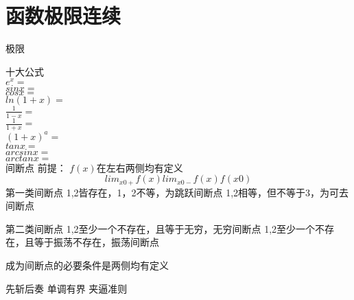 \chapter{函数极限连续}
极限

十大公式 \\
$e^x = $ \\ 
$sinx = $ \\
$cosx = $ \\ 
$ln(1+x) = $ \\
$\frac{1}{1-x} = $ \\
$\frac{1}{1+x} = $ \\
${(1+x)}^a = $ \\
$tanx = $ \\
$arcsinx = $ \\
$arctanx = $ \\

间断点
前提： $f(x)$在左右两侧均有定义
$$ lim_{x0+} f(x)  lim_{x0-}f(x) f(x0)  $$
第一类间断点 1,2皆存在，1，2不等，为跳跃间断点
1,2相等，但不等于3，为可去间断点

第二类间断点
1,2至少一个不存在，且等于无穷，无穷间断点
1,2至少一个不存在，且等于振荡不存在，振荡间断点

成为间断点的必要条件是两侧均有定义


先斩后奏
单调有界
夹逼准则
